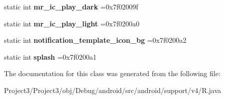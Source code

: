 \begin{DoxyCompactItemize}
\item 
\mbox{\label{classandroid_1_1support_1_1v4_1_1R_1_1drawable_a212b01bddac0c3e8ff8f788f05af93bc}} 
static int {\bfseries mr\+\_\+ic\+\_\+play\+\_\+dark} =0x7f02009f
\item 
\mbox{\label{classandroid_1_1support_1_1v4_1_1R_1_1drawable_aebaa2c3473d21150eefd4ceede6b2961}} 
static int {\bfseries mr\+\_\+ic\+\_\+play\+\_\+light} =0x7f0200a0
\item 
\mbox{\label{classandroid_1_1support_1_1v4_1_1R_1_1drawable_a0c90ca5e6268b488efd35e85f3a43c20}} 
static int {\bfseries notification\+\_\+template\+\_\+icon\+\_\+bg} =0x7f0200a2
\item 
\mbox{\label{classandroid_1_1support_1_1v4_1_1R_1_1drawable_adaa224f1db747b6cf726043ecd773a0c}} 
static int {\bfseries splash} =0x7f0200a1
\end{DoxyCompactItemize}


The documentation for this class was generated from the following file\+:\begin{DoxyCompactItemize}
\item 
Project3/\+Project3/obj/\+Debug/android/src/android/support/v4/R.\+java\end{DoxyCompactItemize}
